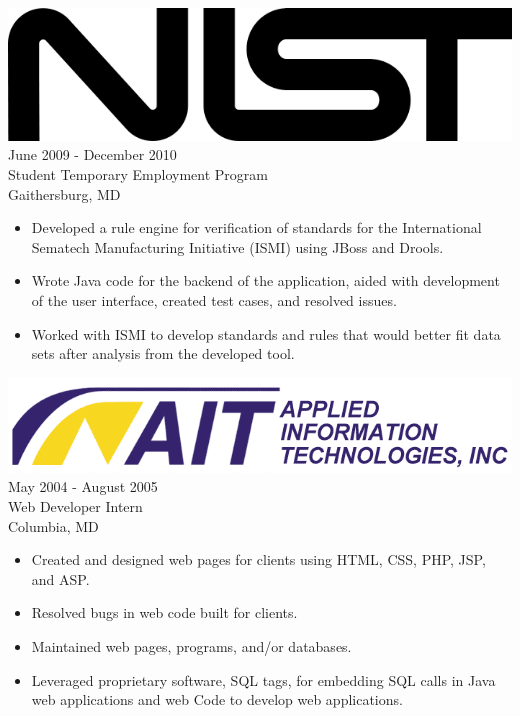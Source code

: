 \documentclass[12pt, line, margin]{res}
\begin{document}
\begin{resume}
\pagebreak

	     {\sl \includegraphics[scale=0.07]{resume_images/645px-NIST_logo.png}} \hfill            June 2009 - December 2010 \\
                Student Temporary Employment Program \\ Gaithersburg, MD
                \begin{itemize}  \itemsep -2pt %
                 \item Developed a rule engine for verification of standards for the \newline
                               International Sematech Manufacturing Initiative (ISMI) using JBoss
                               and Drools.
                 \item Wrote Java code for the backend of the application, aided
                               with development of the user interface,
                               created test cases, and resolved issues.
                 \item Worked with ISMI to develop standards and rules that would
                               better fit data sets after analysis from the developed tool.
                 \end{itemize} 

                {\sl \includegraphics[scale=0.2] {resume_images/ait_inc_logo.png}} \hfill        May 2004 - August 2005 \\
                Web Developer Intern \\ Columbia, MD
                  \begin{itemize}   \itemsep -2pt %
                 \item Created and designed web pages for clients using
                               HTML, CSS, PHP, JSP, and ASP.
                 \item Resolved bugs in web code built for clients.
                 \item Maintained web pages, programs, and/or databases.
                 \item Leveraged proprietary software, SQL tags, for embedding
                               SQL calls in Java web applications and web
                               Code to develop web applications.
                   \end{itemize} 


\end{resume}
\end{document}
